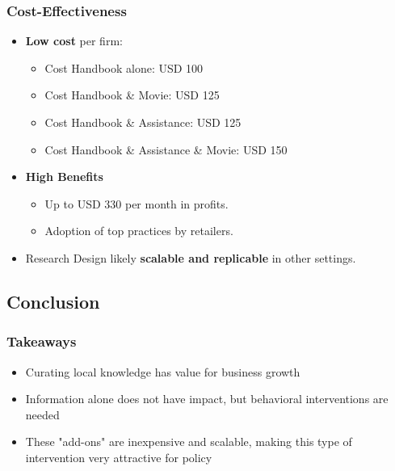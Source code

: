 \documentclass[hideothersubsections, usenames,dvipsnames,10pt]{beamer}
\begin{document}
\begin{frame}
\frametitle{Cost-Effectiveness}
\begin{itemize}
\item \textbf{Low cost} per firm:
\begin{itemize}
\item Cost Handbook alone: USD 100
\item Cost Handbook \& Movie: USD 125
\item Cost Handbook \& Assistance: USD 125
\item Cost Handbook \& Assistance \& Movie: USD 150
\vspace{0.20in}
\end{itemize}
\item \textbf{High Benefits}
    \begin{itemize}
    \item Up to USD 330 per month in profits.
    \item Adoption of top practices by retailers.
    \end{itemize}
\vspace{0.20in}
 \item Research Design likely \textbf{scalable and replicable} in other settings.
\end{itemize}
\end{frame}

\subsection{Conclusion}
\begin{frame}
\frametitle{Takeaways}
\begin{itemize}
    \item Curating local knowledge has value for business growth 
            \vspace{0.20in}
    \item Information alone does not have impact, but behavioral interventions are needed
            \vspace{0.20in}
	\item These "add-ons" are inexpensive and scalable, making this type of intervention very attractive for policy
    
\end{itemize}
\end{frame}


%
%
\end{document}
